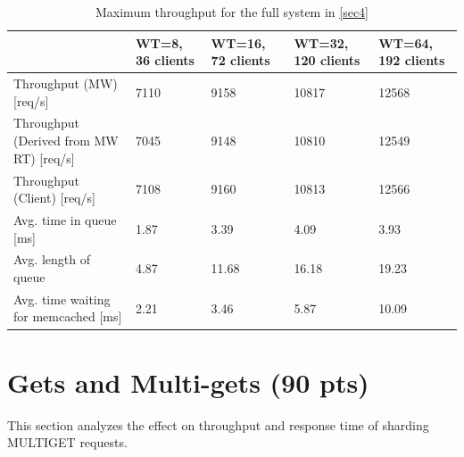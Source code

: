 \documentclass[11pt,a4paper]{article}
\begin{document}
\begin{center}
\begin{table}
	\begin{tabular}{|l|p{1.7cm}|p{1.7cm}|p{1.75cm}|p{1.75cm}|}
		\hline                                              & WT=8, 36 clients & WT=16, 72 clients    & WT=32, 120 clients    & WT=64, 192 clients   \\ 
		\hline Throughput (MW) [req/s]                      & 7110              & 9158                & 10817                 & 12568                 \\ 
		\hline Throughput (Derived from MW RT) [req/s]      & 7045              & 9148                & 10810                 & 12549         \\
		\hline Throughput (Client) [req/s]                  & 7108              & 9160                & 10813                 & 12566                 \\ 
		\hline Avg. time in queue [ms]                      & 1.87            & 3.39              & 4.09                & 3.93                  \\ 
		\hline Avg. length of queue                         & 4.87              & 11.68               & 16.18                 & 19.23                 \\ 
		\hline Avg. time waiting for memcached [ms]         & 2.21            & 3.46                & 5.87                & 10.09                 \\ 
		\hline 
	\end{tabular}
	\caption{Maximum throughput for the full system in \autoref{sec4}} \label{res4}
\end{table}
\end{center}

\section{Gets and Multi-gets (90 pts)}

This section analyzes the effect on throughput and response time of sharding MULTIGET requests.
\end{document}
